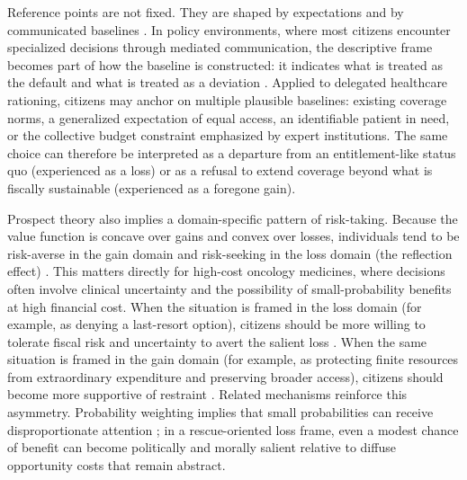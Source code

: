 \documentclass[11pt]{article}\usepackage[]{graphicx}\usepackage[]{xcolor}
\begin{document}
Reference points are not fixed. They are shaped by expectations and by communicated baselines \parencite{Koszegi2006,Koszegi2007}. In policy environments, where most citizens encounter specialized decisions through mediated communication, the descriptive frame becomes part of how the baseline is constructed: it indicates what is treated as the default and what is treated as a deviation \parencite{Kahneman2003a}. Applied to delegated healthcare rationing, citizens may anchor on multiple plausible baselines: existing coverage norms, a generalized expectation of equal access, an identifiable patient in need, or the collective budget constraint emphasized by expert institutions. The same choice can therefore be interpreted as a departure from an entitlement-like status quo (experienced as a loss) or as a refusal to extend coverage beyond what is fiscally sustainable (experienced as a foregone gain).

Prospect theory also implies a domain-specific pattern of risk-taking. Because the value function is concave over gains and convex over losses, individuals tend to be risk-averse in the gain domain and risk-seeking in the loss domain (the reflection effect) \parencite{Kahneman1979,Vis2011}. This matters directly for high-cost oncology medicines, where decisions often involve clinical uncertainty and the possibility of small-probability benefits at high financial cost. When the situation is framed in the loss domain (for example, as denying a last-resort option), citizens should be more willing to tolerate fiscal risk and uncertainty to avert the salient loss \parencite{Hameleers2021}. When the same situation is framed in the gain domain (for example, as protecting finite resources from extraordinary expenditure and preserving broader access), citizens should become more supportive of restraint \parencite{Hameleers2021}. Related mechanisms reinforce this asymmetry. Probability weighting implies that small probabilities can receive disproportionate attention \parencite{Kahneman1979,Kahneman1984a}; in a rescue-oriented loss frame, even a modest chance of benefit can become politically and morally salient relative to diffuse opportunity costs that remain abstract.
\end{document}
